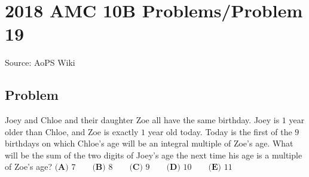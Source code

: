 \documentclass[12pt]{article}
\begin{document}
\section*{{2018 AMC 10B Problems/Problem 19}}
Source: AoPS Wiki

\subsection*{Problem}
Joey and Chloe and their daughter Zoe all have the same birthday. Joey is $1$ year older than Chloe, and Zoe is exactly $1$ year old today. Today is the first of the $9$ birthdays on which Chloe's age will be an integral multiple of Zoe's age. What will be the sum of the two digits of Joey's age the next time his age is a multiple of Zoe's age? $\textbf{(A) }7 \qquad \textbf{(B) }8 \qquad \textbf{(C) }9 \qquad \textbf{(D) }10 \qquad \textbf{(E) }11 \qquad$
\end{document}
